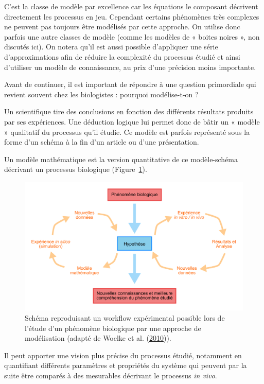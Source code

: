 \documentclass[12pt,a4paper,twoside,openright]{book}
\begin{document}
C'est la classe de modèle par excellence car les équations le composant
décrivent directement les processus en jeu. Cependant certains
phénomènes très complexes ne peuvent pas toujours être modélisés par
cette approche. On utilise donc parfois une autre classes de modèle
(comme les modèles de « boites noires », non discutés ici). On notera
qu'il est aussi possible d'appliquer une série d'approximations afin de
réduire la complexité du processus étudié et ainsi d'utiliser un modèle
de connaissance, au prix d'une précision moins importante.

Avant de continuer, il est important de répondre à une question
primordiale qui revient souvent chez les biologistes : pourquoi
modélise-t-on ?

Un scientifique tire des conclusions en fonction des différents
résultats produits par ses expériences. Une déduction logique lui permet
donc de bâtir un « modèle » qualitatif du processus qu'il étudie. Ce
modèle est parfois représenté sous la forme d'un schéma à la fin d'un
article ou d'une présentation.

Un modèle mathématique est la version quantitative de ce modèle-schéma
décrivant un processus biologique (Figure~\ref{fig:modelling}).

\begin{figure}[htbp]
\centering
\includegraphics{figures/intro/modelling.png}
\caption[Workflow de l'approche modélisation en biologie]{\label{fig:modelling}Schéma
reproduisant un workflow expérimental possible lors de l'étude d'un
phénomène biologique par une approche de modélisation (adapté de Woelke
et al. (\hyperref[ref-Woelke2010]{2010})).}
\end{figure}

Il peut apporter une vision plus précise du processus étudié, notamment
en quantifiant différents paramètres et propriétés du système qui
peuvent par la suite être comparés à des mesurables décrivant le
processus \emph{in vivo}.
\end{document}
